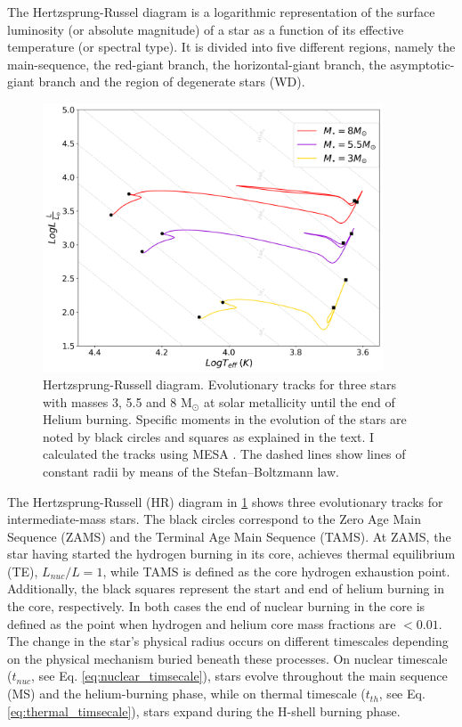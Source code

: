 The Hertzsprung-Russel diagram is a logarithmic representation of the surface luminosity (or absolute magnitude) of a star as a function of its effective temperature (or spectral type). It is divided into five different regions, namely the main-sequence, the red-giant branch, the horizontal-giant branch, the asymptotic-giant branch and the region of degenerate stars (WD). 
\begin{figure}[H]
    \centering
    \includegraphics[width=0.9\textwidth]{Thesis/graphs/HR_inter_stars.pdf}
    \caption{Hertzsprung-Russell diagram. Evolutionary tracks for three stars with masses 3, 5.5 and 8 M$_{\odot}$ at solar metallicity until the end of Helium burning. Specific moments in the evolution of the stars are noted by black circles and squares as explained in the text. I calculated the tracks using MESA \citep{paxton2010modules,paxton2013modules,paxton2015modules,paxton2019modules}. The dashed lines show lines of constant radii by means of the Stefan–Boltzmann law.}
    \label{fig:HR_inter_stars}
\end{figure}
The Hertzsprung-Russell (HR) diagram in \cref{fig:HR_inter_stars} shows three evolutionary tracks for intermediate-mass stars. The black circles correspond to the Zero Age Main Sequence (ZAMS) and the Terminal Age Main Sequence (TAMS). At ZAMS, the star having started the hydrogen burning in its core, achieves thermal equilibrium (TE), $L_{nuc}/L =1$, while TAMS is defined as the core hydrogen exhaustion point. Additionally, the black squares represent the start and end of helium burning in the core, respectively. In both cases the end of nuclear burning in the core is defined as the point when hydrogen and helium core mass fractions are $< 0.01$. The change in the star's physical radius occurs on different timescales depending on the physical mechanism buried beneath these processes. On nuclear timescale ($t_{nuc}$, see Eq. \eqref{eq:nuclear_timsecale}), stars evolve throughout the main sequence (MS) and the helium-burning phase, while on thermal timescale ($t_{th}$, see Eq. \eqref{eq:thermal_timsecale}), stars expand during the H-shell burning phase.
